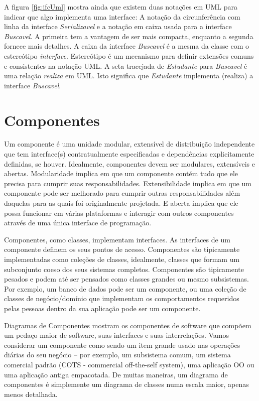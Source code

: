 \documentclass[
	article,			%
	12pt,				%
	openright,
	twoside,			%
	a4paper,			%
	english,			%
	french,
	brazil,				%
	sumario=tradicional
	]{abntex2}
\begin{document}
A figura \ref{fig:ifcUml} mostra ainda que existem duas notações em UML para indicar que algo implementa uma interface: A notação da circunferência com linha da interface \emph{Serializavel} e a notação em caixa usada para a interface \emph{Buscavel}. A primeira tem a vantagem de ser mais compacta, enquanto a segunda fornece mais detalhes. A caixa da interface \emph{Buscavel} é a mesma da classe com o estereótipo \emph{interface}. Estereótipo é um mecanismo para definir extensões comuns e consistentes na notação UML. A seta tracejada de \emph{Estudante} para \emph{Buscavel} é uma relação \emph{realiza} em UML. Isto significa que \emph{Estudante} implementa (realiza) a interface \emph{Buscavel}.

\section{Componentes}

Um componente é uma unidade modular, extensível de distribuição independente que tem interface(s) contratualmente especificadas e dependências explicitamente definidas, se houver. Idealmente, componentes devem ser modulares, extensíveis e abertas. Modularidade implica em que um componente contém tudo que ele precisa para cumprir suas responsabilidades. Extensibilidade implica em que um componente pode ser melhorado para cumprir outras responsabilidades além daquelas para as quais foi originalmente projetada. E aberta implica que ele possa funcionar em várias plataformas e interagir com outros componentes através de uma única interface de programação.

Componentes, como classes, implementam interfaces. As interfaces de um componente definem os seus pontos de acesso. Componentes são tipicamente implementadas como coleções de classes, idealmente, classes que formam um subconjunto coeso dos seus sistemas completos. Componentes são tipicamente pesados e podem até ser pensados como classes grandes ou mesmo subsistemas. Por exemplo, um banco de dados pode ser um componente, ou uma coleção de classes de negócio/domínio que implementam os comportamentos requeridos pelas pessoas dentro da sua aplicação pode ser um componente.

Diagramas de Componentes mostram os componentes de software que compõem um pedaço maior de software, suas interfaces e suas interrelações. Vamos considerar um componente como sendo um item grande usado nas operações diárias do seu negócio -- por exemplo, um subsistema comum, um sistema comercial padrão (COTS - commercial off-the-self system), uma aplicação OO ou uma aplicação antiga empacotada. De muitas maneiras, um diagrama de componentes é simplemente um diagrama de classes numa escala maior, apenas menos detalhada.
\end{document}

